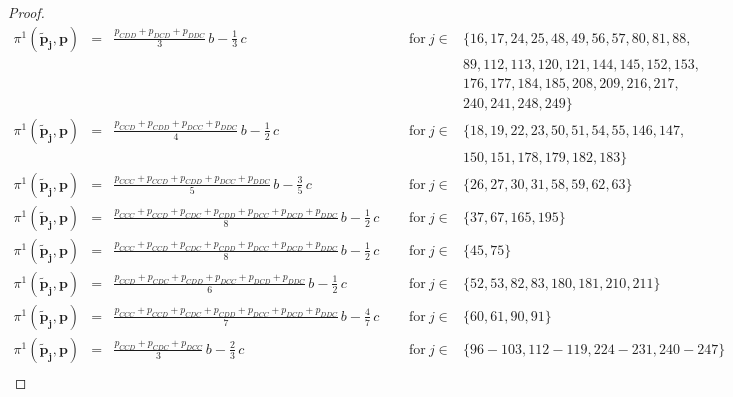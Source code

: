 \documentclass[11pt]{article}
\theoremstyle{plainCl1}
\theoremstyle{plainCl2}
\begin{document}
\begin{proof}
\begin{equation*}
\begin{array}{lclll}
  \pi^1(\mathbf{\tilde p_j},\mathbf{p}) &= 
  &\displaystyle \frac{p_{CDD} + p_{DCD} + p_{DDC}}{3} \, b - \frac{1}{3} \, c
  &~\text{for}~ j\! \in\! 
  & \{16,17,24,25,48,49,56,57,80,81,88,
      \\ & & & &89,112, 113,120,121, 144,145,152,153,
      \\ & & & &176,177,184,185,208,209,216,217,
      \\ & & & &240, 241,248,249\} \\[0.2cm]
      
  \pi^1(\mathbf{\tilde p_j},\mathbf{p}) &= 
  &\displaystyle \frac{p_{CCD} + p_{CDD} + p_{DCC} + p_{DDC}}{4} \, b - \frac{1}{2} \, c
  &~\text{for}~ j\! \in\! 
  & \{ 18, 19, 22, 23, 50, 51, 54, 55, 146, 147,
      \\ & & &  &150, 151, 178, 179, 182, 183\} \\[0.2cm]
      
  \pi^1(\mathbf{\tilde p_j},\mathbf{p}) &= 
  &\displaystyle \frac{p_{CCC} + p_{CCD} + p_{CDD} + p_{DCC} + p_{DDC}}{5} \, b - \frac{3}{5} \, c
  &~\text{for}~ j\! \in\! 
  & \{ 26, 27, 30, 31, 58, 59, 62, 63\} \\ [0.2cm]
  
  \pi^1(\mathbf{\tilde p_j},\mathbf{p}) &= 
  &\displaystyle \frac{p_{CCC} + p_{CCD} + p_{CDC} + p_{CDD} + p_{DCC} + p_{DCD} + p_{DDC}}{8} \, b - \frac{1}{2} \, c
  &~\text{for}~ j\! \in\! 
  & \{ 37, 67, 165, 195\} \\ [0.2cm]
  
  \pi^1(\mathbf{\tilde p_j},\mathbf{p}) &= 
  &\displaystyle \frac{p_{CCC} + p_{CCD} + p_{CDC} + p_{CDD} + p_{DCC} + p_{DCD} + p_{DDC}}{8} \, b - \frac{1}{2} \, c ~~~~~
  &~\text{for}~ j\! \in\! 
  & \{ 45, 75\} \\ [0.2cm]
  
  \pi^1(\mathbf{\tilde p_j},\mathbf{p}) &= 
  &\displaystyle \frac{p_{CCD}+ p_{CDC}+ p_{CDD}+ p_{DCC}+ p_{DCD}+ p_{DDC}}{6} \, b - \frac{1}{2} \, c
  &~\text{for}~ j\! \in\! 
  & \{ 52, 53, 82, 83, 180, 181, 210, 211\} \\  [0.2cm]
  
  \pi^1(\mathbf{\tilde p_j},\mathbf{p}) &= 
  &\displaystyle \frac{p_{CCC} + p_{CCD} + p_{CDC} + p_{CDD} + p_{DCC} + p_{DCD} + p_{DDC}}{7} \, b - \frac{4}{7} \, c
  &~\text{for}~ j\! \in\! 
  & \{ 60, 61, 90, 91\} \\ [0.2cm]
  
  \pi^1(\mathbf{\tilde p_j},\mathbf{p}) &= 
  &\displaystyle \frac{p_{CCD} + p_{CDC} + p_{DCC}}{3} \, b - \frac{2}{3} \, c
  &~\text{for}~ j\! \in\! 
  & \{ 96\!- \!103, 112\!- \!119, 224\!- \!231, 240\!- \!247\} \\ [0.2cm]
      

\end{array}
\end{equation*}
\end{proof}
\end{document}
